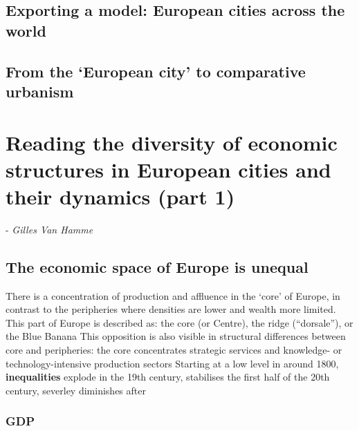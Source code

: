\documentclass{article}
\begin{document}
\subsubsection{}
\subsubsection{}

\subsection{Exporting a model: European cities across the world}


\subsection{From the `European city' to comparative urbanism}




\section{Reading the diversity of economic structures in European cities and their dynamics (part 1)}
\date{October 18th, 2021} - \textit{Gilles Van Hamme}

\subsection{The economic space of Europe is unequal}

\begin{outline}
	\1 There is a concentration of production and affluence in the `core' of Europe, in contrast to the peripheries where densities are lower and wealth more limited. This part of Europe is described as: the core (or Centre), the ridge (``dorsale''), or the Blue Banana
	\1 This opposition is also visible in structural differences between core and peripheries: the core concentrates strategic services and knowledge- or technology-intensive production sectors
	\1 Starting at a low level in around 1800, \textbf{inequalities} explode in the 19th century, stabilises the first half of the 20th century, severley diminishes after
\end{outline}

\subsubsection{GDP}
\end{document}
